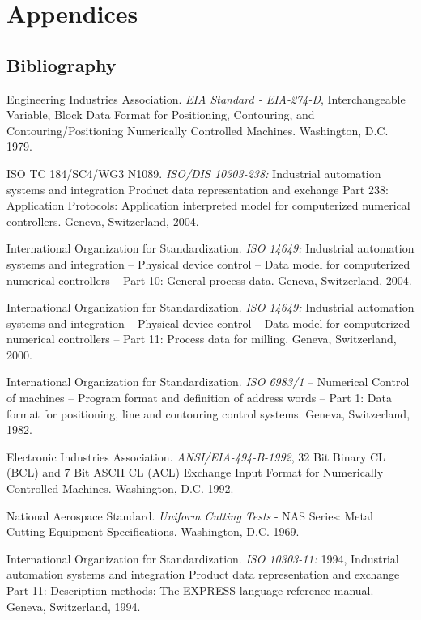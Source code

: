 \appendix
\section*{Appendices}
\renewcommand{\thesubsection}{\Alph{subsection}}

\subsection{Bibliography}
\label{Bibliography}

Engineering Industries Association. \textit{EIA Standard - EIA-274-D}, Interchangeable Variable, Block Data Format for Positioning, Contouring, and Contouring/Positioning Numerically Controlled Machines. Washington, D.C. 1979.

ISO TC 184/SC4/WG3 N1089. \textit{ISO/DIS 10303-238:} Industrial automation systems and integration  Product data representation and exchange  Part 238: Application Protocols: Application interpreted model for computerized numerical controllers. Geneva, Switzerland, 2004.

International Organization for Standardization. \textit{ISO 14649:} Industrial automation systems and integration – Physical device control – Data model for computerized numerical controllers – Part 10: General process data. Geneva, Switzerland, 2004.

International Organization for Standardization. \textit{ISO 14649:} Industrial automation systems and integration – Physical device control – Data model for computerized numerical controllers – Part 11: Process data for milling. Geneva, Switzerland, 2000.

International Organization for Standardization. \textit{ISO 6983/1} – Numerical Control of machines – Program format and definition of address words – Part 1: Data format for positioning, line and contouring control systems. Geneva, Switzerland, 1982.

Electronic Industries Association. \textit{ANSI/EIA-494-B-1992}, 32 Bit Binary CL (BCL) and 7 Bit ASCII CL (ACL) Exchange Input Format for Numerically Controlled Machines. Washington, D.C. 1992.

National Aerospace Standard. \textit{Uniform Cutting Tests} - NAS Series: Metal Cutting Equipment Specifications. Washington, D.C. 1969.

International Organization for Standardization. \textit{ISO 10303-11:} 1994, Industrial automation systems and integration  Product data representation and exchange  Part 11: Description methods: The EXPRESS language reference manual. Geneva, Switzerland, 1994.

